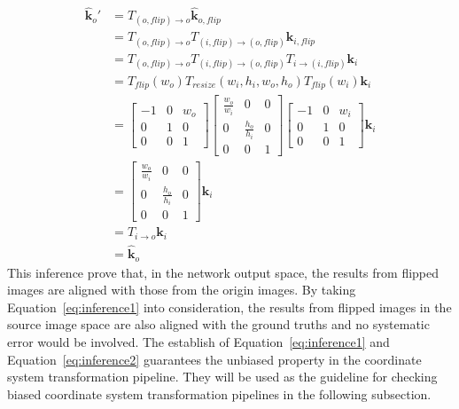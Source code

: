 \documentclass[10pt,journal,compsoc]{IEEEtran}
\begin{document}
\begin{equation}
\label{eq:inference2}
    \begin{split}
    \hat{\textbf{k}}_o' &= T_{(o,flip)\rightarrow o}\hat{\textbf{k}}_{o,flip}\\
                        &= T_{(o,flip)\rightarrow o}T_{(i,flip)\rightarrow (o,flip)}\textbf{k}_{i,flip} \\
                        &= T_{(o,flip)\rightarrow o}T_{(i,flip)\rightarrow (o,flip)}T_{i \rightarrow (i,flip)}\textbf{k}_{i} \\
                        &= T_{flip}(w_o)T_{resize}(w_i,h_i,w_o,h_o)T_{flip}(w_i)\textbf{k}_{i} \\
                        &= \begin{bmatrix} -1 & 0 & w_o \\
                    0 & 1 & 0 \\
                    0 & 0 &1 \end{bmatrix}\begin{bmatrix} \frac{w_o}{w_i} & 0 & 0 \\
                    0 & \frac{h_o}{h_i} & 0 \\
                    0 & 0 &1 \end{bmatrix}\begin{bmatrix} -1 & 0 & w_i \\
                    0 & 1 & 0 \\
                    0 & 0 &1 \end{bmatrix}\textbf{k}_{i}\\
                        &= \begin{bmatrix} \frac{w_o}{w_i} & 0 & 0 \\
                    0 & \frac{h_o}{h_i} & 0 \\
                    0 & 0 &1 \end{bmatrix}\textbf{k}_i\\
                        &= T_{i\rightarrow o}\textbf{k}_i\\
                        &= \hat{\textbf{k}}_o
    \end{split}
\end{equation}
This inference prove that, in the network output space, the results from flipped images are aligned with those from the origin images. By taking Equation~\ref{eq:inference1} into consideration, the results from flipped images in the source image space are also aligned with the ground truths and no systematic error would be involved. The establish of Equation~\ref{eq:inference1} and Equation~\ref{eq:inference2} guarantees the unbiased property in the coordinate system transformation pipeline. They will be used as the guideline for checking biased coordinate system transformation pipelines in the following subsection.
\end{document}
